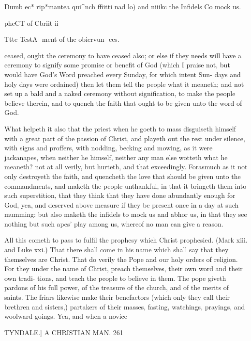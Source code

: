 \documentclass{custom}
\begin{document}
{Dumb ec* 
rip*mantea 
qui^nch 
ffiitti nad 
lo^^i and 
niiikc the 
Infidels Co 
mock us. 

phcCT of 
Cbriit ii 

Ttte TcstA- 
ment of the 
obiervun- 
ces. 

ceased, ought the ceremony to have ceased also; or else if 
they needs will have a ceremony to signify some promise 
or benefit of God (which I praise not, but would have 
God's Word preached every Sunday, for which intent Sun- 
days and holy days were ordained) then let them tell the 
people what it meaneth; and not set up a bald and a 
naked ceremony without signification, to make the people 
believe therein, and to quench the faith that ought to be 
given unto the word of God. 

What helpeth it also that the priest when he goeth to 
mass disguiseth himself with a great part of the passion 
of Christ, and playeth out the rest under silence, with 
signs and proffers, with nodding, becking and mowing, 
as it were jackanapes, when neither he himself, neither any 
man else wotteth what he meaneth? not at all verily, but 
hurteth, and that exceedingly. Forasmuch as it not only 
destroyeth the faith, and quencheth the love that should be 
given unto the commandments, and maketh the people 
unthankful, in that it bringeth them into such superstition, 
that they think that they have done abundantly enough for 
God, yea, and deserved above measure if they be present 
once in a day at such mumming: but also maketh the 
infidels to mock us and abhor us, in that they see nothing 
but such apes' play among us, whereof no man can give 
a reason. 

All this cometh to pass to fulfil the prophesy which 
Christ prophesied. (Mark xiii. and Luke xxi.) That 
there shall come in his name which shall say that they 
themselves are Christ. That do verily the Pope and our 
holy orders of religion. For they under the name of Christ, 
preach themselves, their own word and their own tradi- 
tions, and teach the people to believe in them. The pope 
giveth pardons of his full power, of the treasure of the 
church, and of the merits of saints. The friars likewise 
make their benefactors (which only they call their brethren 
and sisters,) partakers of their masses, fasting, watchings, 
prayings, and woolward goings. Yea, and when a novice 


TYNDALE.]
A CHRISTIAN MAN.
261

}
\end{document}
